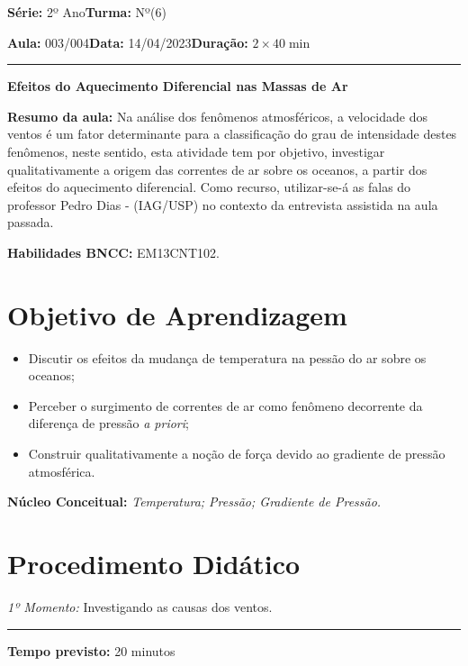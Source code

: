 \documentclass[
12pt,				%
openright,			%
oneside,			%
a4paper,			%
chapter=TITLE,		%
english,			%
brazil				%
]{abntex2}
\begin{document}
\par\noindent\textbf{Série:} 2º Ano\hfill{}\textbf{Turma:} Nº(6)
\par\noindent\textbf{Aula:} 003/004\hfill{}\textbf{Data:} 14/04/2023\hfill{}\textbf{Duração:} $2\times 40\min$
\rule{\textwidth}{.5pt}
\bigskip{}  
\noindent
\begin{center}
	\textbf{Efeitos do Aquecimento Diferencial nas Massas de Ar}
\end{center}
\par\noindent\textbf{Resumo da aula:} Na análise dos fenômenos atmosféricos, a velocidade dos ventos é um fator determinante para a classificação do grau de intensidade destes fenômenos, neste sentido, esta atividade tem por objetivo, investigar qualitativamente a origem das correntes de ar sobre os oceanos, a partir dos efeitos do aquecimento diferencial. Como recurso, utilizar-se-á as falas do professor Pedro Dias - (IAG/USP) no contexto da entrevista assistida na aula passada. 
\par\noindent\textbf{Habilidades BNCC:} EM13CNT102.

\section{Objetivo de Aprendizagem}
\begin{itemize}
	\item Discutir os efeitos da mudança de temperatura na pessão do ar sobre os oceanos;
	\item Perceber o surgimento de correntes de ar como fenômeno decorrente da diferença de pressão \textit{a priori};
	\item Construir qualitativamente a noção de força devido ao gradiente de pressão atmosférica.
\end{itemize}

\medskip{}

\noindent\textbf{Núcleo Conceitual:} \emph{Temperatura; Pressão; Gradiente de Pressão.}
\newpage

\section{Procedimento Didático} 
\noindent\emph{1º Momento:} Investigando as causas dos ventos.
\par\noindent\rule{.3\textwidth}{.5pt}  
\par\noindent\textbf{Tempo previsto:} 20 minutos
\end{document}
